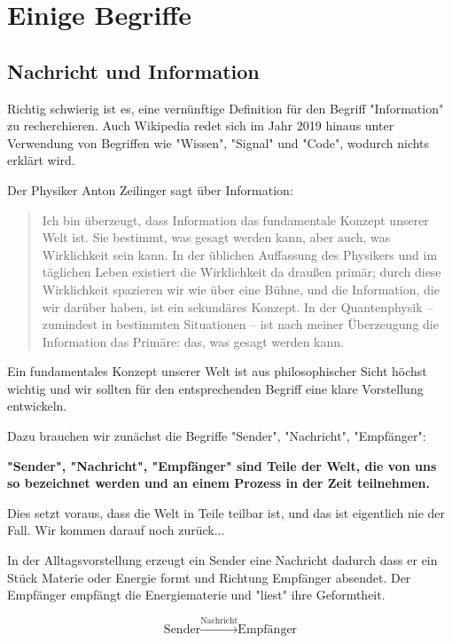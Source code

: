 \documentclass[12pt]{book}
\begin{document}
\chapter{Einige Begriffe}

\section{Nachricht und Information}

Richtig schwierig ist es, eine vernünftige Definition für den Begriff "Information" zu recherchieren. Auch Wikipedia redet sich im Jahr 2019 hinaus unter Verwendung von Begriffen wie "Wissen", "Signal" und "Code", wodurch nichts erklärt wird. 

Der Physiker Anton Zeilinger sagt über Information:
\begin{quote}\begin{tcolorbox}
Ich bin überzeugt, dass Information das fundamentale Konzept unserer Welt ist. Sie bestimmt, was gesagt werden kann, aber auch, was Wirklichkeit sein kann. In der üblichen Auffassung des Physikers und im täglichen Leben existiert die Wirklichkeit da draußen primär; durch diese Wirklichkeit spazieren wir wie über eine Bühne, und die Information, die wir darüber haben, ist ein sekundäres Konzept. In der Quantenphysik – zumindest in bestimmten Situationen – ist nach meiner Überzeugung die Information das Primäre: das, was gesagt werden kann.
\end{tcolorbox}\end{quote}

Ein fundamentales Konzept unserer Welt ist aus philosophischer Sicht höchst wichtig und wir sollten für den entsprechenden Begriff eine klare Vorstellung entwickeln.

Dazu brauchen wir zunächst die Begriffe "Sender", "Nachricht", "Empfänger": 

\textbf{"Sender", "Nachricht", "Empfänger" sind Teile der Welt, die von uns so bezeichnet werden und an einem Prozess in der Zeit teilnehmen.} 

Dies setzt voraus, dass die Welt in Teile teilbar ist, und das ist eigentlich nie der Fall. Wir kommen darauf noch zurück...

In der Alltagsvorstellung erzeugt ein Sender eine Nachricht dadurch dass er ein Stück Materie oder Energie formt und Richtung Empfänger absendet. Der Empfänger empfängt die Energiematerie und "liest" ihre Geformtheit.

\begin{equation} 
\text{Sender}  \xrightarrow[]{\text{Nachricht}} \text{Empfänger} 
\label{eq:messaging_classical}
\end{equation}
\end{document}
